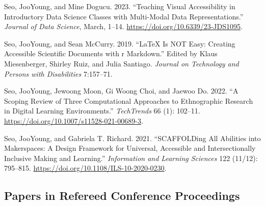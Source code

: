 \documentclass[11pt,a4paper,]{awesome-cv}
\newlength{\cslhangindent}
\newenvironment{CSLReferences}[2] %
 {\begin{list}{}{%
  \setlength{\itemindent}{0pt}
  \setlength{\leftmargin}{0pt}
  \setlength{\parsep}{0pt}
  \ifodd #1
   \setlength{\leftmargin}{\cslhangindent}
   \setlength{\itemindent}{-1\cslhangindent}
  \fi
  \setlength{\itemsep}{#2\baselineskip}}}
 {\end{list}}
\begin{document}
\begin{CSLReferences}{1}{0}
Seo, JooYoung, and Mine Dogucu. 2023. {``Teaching Visual Accessibility
in Introductory Data Science Classes with Multi-Modal Data
Representations.''} \emph{Journal of Data Science}, March, 1--14.
\url{https://doi.org/10.6339/23-JDS1095}.

Seo, JooYoung, and Sean McCurry. 2019. {``LaTeX Is NOT Easy: Creating
Accessible Scientific Documents with r Markdown.''} Edited by Klaus
Miesenberger, Shirley Ruiz, and Julia Santiago. \emph{Journal on
Technology and Persons with Disabilities} 7:157--71.

Seo, JooYoung, Jewoong Moon, Gi Woong Choi, and Jaewoo Do. 2022. {``A
Scoping Review of Three Computational Approaches to Ethnographic
Research in Digital Learning Environments.''} \emph{TechTrends} 66 (1):
102--11. \url{https://doi.org/10.1007/s11528-021-00689-3}.

Seo, JooYoung, and Gabriela T. Richard. 2021. {``SCAFFOLDing All
Abilities into Makerspaces: A Design Framework for Universal, Accessible
and Intersectionally Inclusive Making and Learning.''} \emph{Information
and Learning Sciences} 122 (11/12): 795--815.
\url{https://doi.org/10.1108/ILS-10-2020-0230}.

\end{CSLReferences}

\subsection{Papers in Refereed Conference
Proceedings}\label{papers-in-refereed-conference-proceedings}
\end{document}
